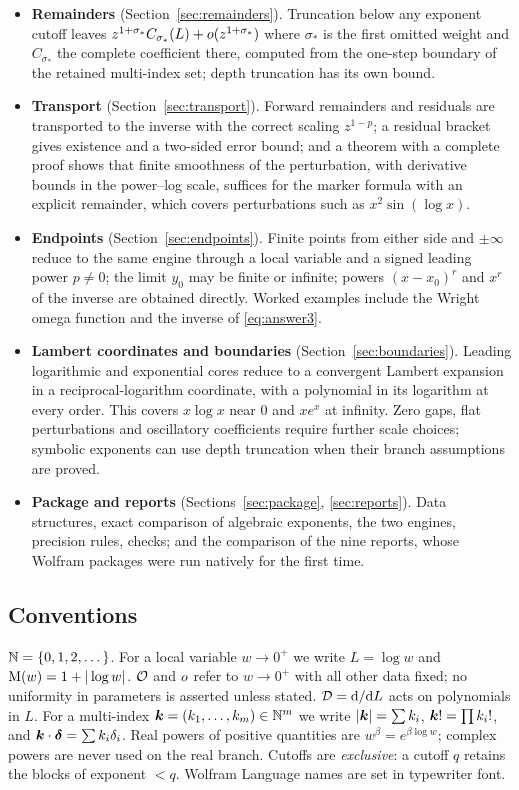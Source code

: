 \begin{itemize}[leftmargin=1.6em]
\item \textbf{Remainders} (Section~\ref{sec:remainders}). Truncation below any exponent cutoff leaves $z^{1+\sigma_*}C_{\sigma_*}(L)+o(z^{1+\sigma_*})$ where $\sigma_*$ is the first omitted weight and $C_{\sigma_*}$ the complete coefficient there, computed from the one-step boundary of the retained multi-index set; depth truncation has its own bound.
\item \textbf{Transport} (Section~\ref{sec:transport}). Forward remainders and residuals are transported to the inverse with the correct scaling $z^{1-p}$; a residual bracket gives existence and a two-sided error bound; and a theorem with a complete proof shows that finite smoothness of the perturbation, with derivative bounds in the power--log scale, suffices for the marker formula with an explicit remainder, which covers perturbations such as $x^2\sin(\log x)$.
\item \textbf{Endpoints} (Section~\ref{sec:endpoints}). Finite points from either side and $\pm\infty$ reduce to the same engine through a local variable and a signed leading power $p\ne0$; the limit $y_0$ may be finite or infinite; powers $(x-x_0)^r$ and $x^r$ of the inverse are obtained directly. Worked examples include the Wright omega function and the inverse of \eqref{eq:answer3}.
\item \textbf{Lambert coordinates and boundaries} (Section~\ref{sec:boundaries}). Leading logarithmic and exponential cores reduce to a convergent Lambert expansion in a reciprocal-logarithm coordinate, with a polynomial in its logarithm at every order. This covers $x\log x$ near $0$ and $xe^x$ at infinity. Zero gaps, flat perturbations and oscillatory coefficients require further scale choices; symbolic exponents can use depth truncation when their branch assumptions are proved.
\item \textbf{Package and reports} (Sections~\ref{sec:package}, \ref{sec:reports}). Data structures, exact comparison of algebraic exponents, the two engines, precision rules, checks; and the comparison of the nine reports, whose Wolfram packages were run natively for the first time.
\end{itemize}

\subsection{Conventions}

$\mathbb N=\{0,1,2,\dots\}$. For a local variable $w\to0^+$ we write $L=\log w$ and $\mathrm M(w)=1+|\log w|$. $\mathcal O$ and $o$ refer to $w\to0^+$ with all other data fixed; no uniformity in parameters is asserted unless stated. $\mathcal D=\mathrm d/\mathrm d L$ acts on polynomials in $L$. For a multi-index $\boldsymbol k=(k_1,\dots,k_m)\in\mathbb N^m$ we write $|\boldsymbol k|=\sum k_i$, $\boldsymbol k!=\prod k_i!$, and $\boldsymbol k\cdot\boldsymbol\delta=\sum k_i\delta_i$. Real powers of positive quantities are $w^\beta=e^{\beta\log w}$; complex powers are never used on the real branch. Cutoffs are \emph{exclusive}: a cutoff $q$ retains the blocks of exponent $<q$. Wolfram Language names are set in typewriter font.
